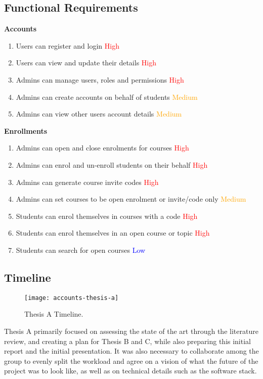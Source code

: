 \subsection{Functional Requirements}
\textbf{Accounts}
    \begin{enumerate}
    \item Users can register and login \textcolor{Red}{High}
    \item Users can view and update their details \textcolor{Red}{High}
    \item Admins can manage users, roles and permissions \textcolor{Red}{High}
    \item Admins can create accounts on behalf of students \textcolor{Orange}{Medium}
    \item Admins can view other users account details \textcolor{Orange}{Medium}
    \end{enumerate}

\textbf{Enrollments}
    \begin{enumerate}
    \item Admins can open and close enrolments for courses \textcolor{Red}{High}
    \item Admins can enrol and un-enroll students on their behalf \textcolor{Red}{High}
    \item Admins can generate course invite codes \textcolor{Red}{High}
    \item Admins can set courses to be open enrolment or invite/code only \textcolor{Orange}{Medium}
    \item Students can enrol themselves in courses with a code \textcolor{Red}{High}
    \item Students can enrol themselves in an open course or topic \textcolor{Red}{High}
    \item Students can search for open courses \textcolor{Blue}{Low}
    \end{enumerate}

\subsection{Timeline}

\begin{figure}[h!]
  \centering
  \texttt{[image: accounts-thesis-a]}
  \caption{Thesis A Timeline.}
\end{figure}
Thesis A primarily focused on assessing the state of the art through the literature review, and creating a plan for Thesis B and C, while also preparing this initial report and the initial presentation. It was also necessary to collaborate among the group to evenly split the workload and agree on a vision of what the future of the project was to look like, as well as on technical details such as the software stack.

